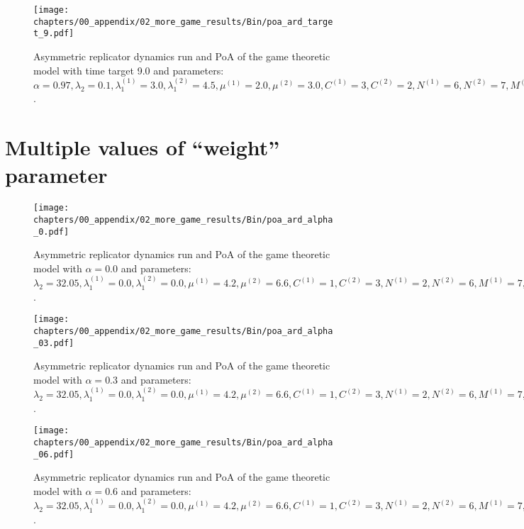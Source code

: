 \begin{figure}[H]
    \texttt{[image: chapters/00\_appendix/02\_more\_game\_results/Bin/poa\_ard\_target\_9.pdf]}
    \caption{Asymmetric replicator dynamics run and PoA of the game theoretic
    model with time target 9.0 and parameters: \(\alpha = 0.97,
    \lambda_2 = 0.1, \lambda_1^{(1)} = 3.0, \lambda_1^{(2)} = 4.5,
    \mu^{(1)} = 2.0, \mu^{(2)} = 3.0, C^{(1)} = 3, C^{(2)} = 2,
    N^{(1)} = 6, N^{(2)} = 7, M^{(1)} = 5, M^{(2)} = 4\).}
    \label{fig:poa_ard_target_9}
\end{figure}


\section{Multiple values of ``weight'' parameter}


\begin{figure}[H]
    \texttt{[image: chapters/00\_appendix/02\_more\_game\_results/Bin/poa\_ard\_alpha\_0.pdf]}
    \caption{Asymmetric replicator dynamics run and PoA of the game theoretic
    model with \(\alpha = 0.0\) and parameters: \(\lambda_2 = 32.05,
    \lambda_1^{(1)} = 0.0, \lambda_1^{(2)} = 0.0, \mu^{(1)} = 4.2,
    \mu^{(2)} = 6.6, C^{(1)} = 1, C^{(2)} = 3, N^{(1)} = 2, N^{(2)} = 6,
    M^{(1)} = 7, M^{(2)} = 4, t = 2.0\).}
    \label{fig:poa_ard_alpha_0}
\end{figure}



\begin{figure}[H]
    \texttt{[image: chapters/00\_appendix/02\_more\_game\_results/Bin/poa\_ard\_alpha\_03.pdf]}
    \caption{Asymmetric replicator dynamics run and PoA of the game theoretic
    model with \(\alpha = 0.3\) and parameters: \(\lambda_2 = 32.05,
    \lambda_1^{(1)} = 0.0, \lambda_1^{(2)} = 0.0, \mu^{(1)} = 4.2,
    \mu^{(2)} = 6.6, C^{(1)} = 1, C^{(2)} = 3, N^{(1)} = 2, N^{(2)} = 6,
    M^{(1)} = 7, M^{(2)} = 4, t = 2.0\).}
    \label{fig:poa_ard_alpha_03}
\end{figure}




\begin{figure}[H]
    \texttt{[image: chapters/00\_appendix/02\_more\_game\_results/Bin/poa\_ard\_alpha\_06.pdf]}
    \caption{Asymmetric replicator dynamics run and PoA of the game theoretic
    model with \(\alpha = 0.6\) and parameters: \(\lambda_2 = 32.05,
    \lambda_1^{(1)} = 0.0, \lambda_1^{(2)} = 0.0, \mu^{(1)} = 4.2,
    \mu^{(2)} = 6.6, C^{(1)} = 1, C^{(2)} = 3, N^{(1)} = 2, N^{(2)} = 6,
    M^{(1)} = 7, M^{(2)} = 4, t = 2.0\).}
    \label{fig:poa_ard_alpha_06}
\end{figure}



